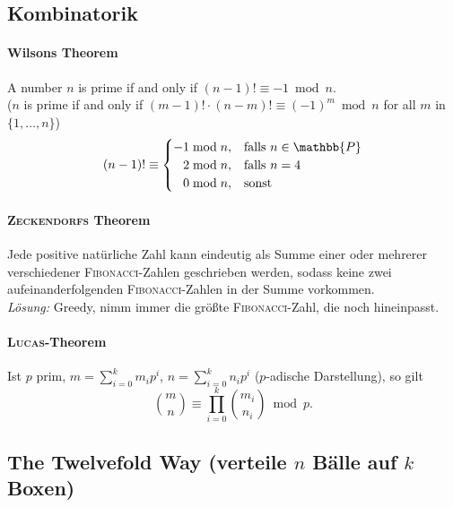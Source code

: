 \subsection{Kombinatorik}

\paragraph{Wilsons Theorem}
A number $n$ is prime if and only if
$(n-1)!\equiv -1\bmod{n}$.\\
($n$ is prime if and only if $(m-1)!\cdot(n-m)!\equiv(-1)^m\bmod{n}$ for all $m$ in $\{1,\dots,n\}$)
\begin{align*}
	(n-1)!\equiv\begin{cases}
		-1\bmod{n},&\mathrm{falls}~n \in \mathbb{P}\\
		\hphantom{-}2\bmod{n},&\mathrm{falls}~n = 4\\
		\hphantom{-}0\bmod{n},&\mathrm{sonst}
	\end{cases}
\end{align*}

\paragraph{\textsc{Zeckendorfs} Theorem}
Jede positive natürliche Zahl kann eindeutig als Summe einer oder mehrerer
verschiedener \textsc{Fibonacci}-Zahlen geschrieben werden, sodass keine zwei
aufeinanderfolgenden \textsc{Fibonacci}-Zahlen in der Summe vorkommen.\\
\emph{Lösung:} Greedy, nimm immer die größte \textsc{Fibonacci}-Zahl, die noch
hineinpasst.

\paragraph{\textsc{Lucas}-Theorem}
Ist $p$ prim, $m=\sum_{i=0}^km_ip^i$, $n=\sum_{i=0}^kn_ip^i$ ($p$-adische Darstellung),
so gilt
\vspace{-0.75\baselineskip}
\[
	\binom{m}{n} \equiv \prod_{i=0}^k\binom{m_i}{n_i} \bmod{p}.
\]

\subsection{The Twelvefold Way \textnormal{(verteile $n$ Bälle auf $k$ Boxen)}}


